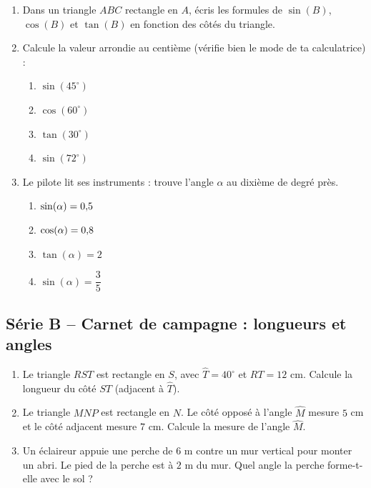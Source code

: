 \documentclass[../main.tex]{subfiles}
\begin{document}
\begin{enumerate}[label=\textbf{\arabic*.}]

\item Dans un triangle $ABC$ rectangle en $A$, écris les formules de $\sin(B)$, $\cos(B)$ et $\tan(B)$ en fonction des côtés du triangle.

\item Calcule la valeur arrondie au centième (vérifie bien le mode de ta calculatrice) :
\begin{enumerate}[label=\alph*)]
  \item $\sin(45^\circ)$ \qquad
  \item $\cos(60^\circ)$ \qquad
  \item $\tan(30^\circ)$ \qquad
  \item $\sin(72^\circ)$
\end{enumerate}

\item Le pilote lit ses instruments : trouve l'angle $\alpha$ au dixième de degré près.
\begin{enumerate}[label=\alph*)]
  \item $\sin(\alpha) = 0{,} 5$ \qquad
  \item $\cos(\alpha) = 0{,} 8$ \qquad
  \item $\tan(\alpha) = 2$ \qquad
  \item $\sin(\alpha) = \dfrac{3}{5}$
\end{enumerate}

\end{enumerate}

\subsection{Série B -- Carnet de campagne : longueurs et angles}

\begin{enumerate}[label=\textbf{\arabic*.},start=4]

\item Le triangle $RST$ est rectangle en $S$, avec $\widehat{T} = 40^\circ$ et $RT = 12$ cm. Calcule la longueur du côté $ST$ (adjacent à $\widehat{T}$).

\item Le triangle $MNP$ est rectangle en $N$. Le côté opposé à l'angle $\widehat{M}$ mesure $5$ cm et le côté adjacent mesure $7$ cm. Calcule la mesure de l'angle $\widehat{M}$.

\item Un éclaireur appuie une perche de $6$ m contre un mur vertical pour monter un abri. Le pied de la perche est à $2$ m du mur. Quel angle la perche forme-t-elle avec le sol ?

\end{enumerate}
\end{document}
